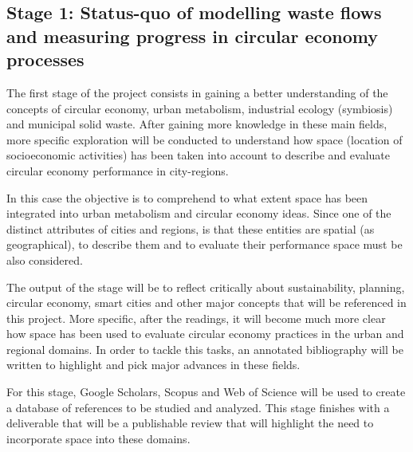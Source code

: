 \subsection{Stage 1: Status-quo of modelling waste flows and measuring progress in circular economy processes}
The first stage of the project consists in gaining a better understanding of the concepts of circular economy, urban metabolism, industrial ecology (symbiosis) and municipal solid waste. After gaining more knowledge in these main fields, more specific exploration will be conducted to understand how space (location of socioeconomic activities) has been taken into account to describe and evaluate circular economy performance in city-regions. \par
In this case the objective is to comprehend to what extent space has been integrated into urban metabolism and circular economy ideas. Since one of the distinct attributes of cities and regions, is that these entities are spatial (as geographical), to describe them and to evaluate their performance space must be also considered.  \par
The output of the stage will be to reflect critically about sustainability, planning, circular economy, smart cities and other major concepts that will be referenced in this project. More specific, after the readings, it will become much more clear how space has been used to evaluate circular economy practices in the urban and regional domains. In order to tackle this tasks, an annotated bibliography will be written to highlight and pick major advances in these fields. \par
For this stage, Google Scholars, Scopus and Web of Science will be used to create a database of references to be studied and analyzed. This stage finishes with a deliverable that will be a publishable review that will highlight the need to incorporate space into these domains.\par






